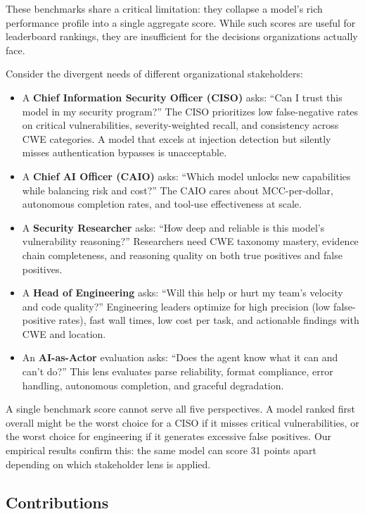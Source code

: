\documentclass[10pt,twocolumn]{article}
\begin{document}
These benchmarks share a critical limitation: they collapse a model's rich performance profile into a single aggregate score. While such scores are useful for leaderboard rankings, they are insufficient for the decisions organizations actually face.

Consider the divergent needs of different organizational stakeholders:

\begin{itemize}[noitemsep,topsep=2pt]
    \item A \textbf{Chief Information Security Officer (CISO)} asks: ``Can I trust this model in my security program?'' The CISO prioritizes low false-negative rates on critical vulnerabilities, severity-weighted recall, and consistency across CWE categories. A model that excels at injection detection but silently misses authentication bypasses is unacceptable.
    \item A \textbf{Chief AI Officer (CAIO)} asks: ``Which model unlocks new capabilities while balancing risk and cost?'' The CAIO cares about MCC-per-dollar, autonomous completion rates, and tool-use effectiveness at scale.
    \item A \textbf{Security Researcher} asks: ``How deep and reliable is this model's vulnerability reasoning?'' Researchers need CWE taxonomy mastery, evidence chain completeness, and reasoning quality on both true positives and false positives.
    \item A \textbf{Head of Engineering} asks: ``Will this help or hurt my team's velocity and code quality?'' Engineering leaders optimize for high precision (low false-positive rates), fast wall times, low cost per task, and actionable findings with CWE and location.
    \item An \textbf{AI-as-Actor} evaluation asks: ``Does the agent know what it can and can't do?'' This lens evaluates parse reliability, format compliance, error handling, autonomous completion, and graceful degradation.
\end{itemize}

A single benchmark score cannot serve all five perspectives. A model ranked first overall might be the worst choice for a CISO if it misses critical vulnerabilities, or the worst choice for engineering if it generates excessive false positives. Our empirical results confirm this: the same model can score 31 points apart depending on which stakeholder lens is applied.

\subsection{Contributions}
\end{document}

